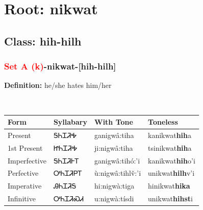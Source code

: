 \needspace{4in}
\section*{Root: nikwat}
\nopagebreak
{}
\needspace{3in}
\subsection*{Class: hih-hilh}
\nopagebreak
\needspace{2in}
\subsubsection*{\textcolor{Red}{Set A (k)}{-}\textbf{nikwat}{-}[hih-hilh]}
\nopagebreak
\textbf{Definition: } he/she hates him/her
\\[0.5em]
\begin{tabularx}{\textwidth}{l X X X}%
\toprule%
\textbf{Form}&\textbf{Syllabary}&\textbf{With Tone}&\textbf{Toneless}\\%
\midrule%
Present&ᎦᏂᏆᏘᎭ&ganigwâ:tiha&kanikwat\textbf{hih}a\\%
1st Present&ᏥᏂᏆᏘᎭ&ji:nigwâ:tiha&tsinikwat\textbf{hih}a\\%
Imperfective&ᎦᏂᏆᏘᎰᎢ&ganigwâ:tihó:’i&kanikwat\textbf{hih}o'i\\%
Perfective&ᎤᏂᏆᏘᏢᎢ&ù:nigwâ:tihlv̌:’i&unikwat\textbf{hilh}v'i\\%
Imperative&ᎯᏂᏆᏘᎦ&hi:nigwà:tiga&hinikwat\textbf{hika}\\%
Infinitive&ᎤᏂᏆᏘᏍᏗ&u:nigwà:tísdi&unikwat\textbf{hihst}i\\%
\bottomrule%
\end{tabularx}
\\[1em]